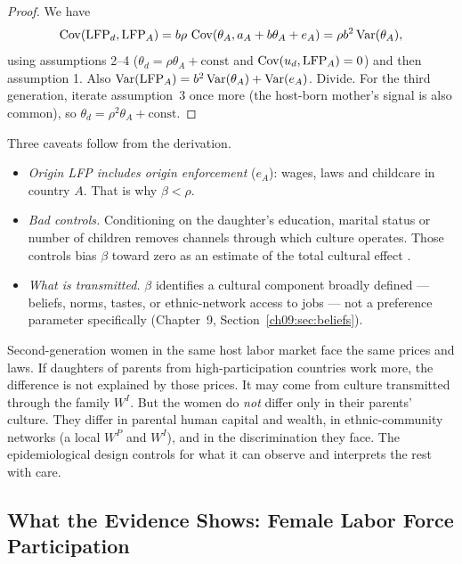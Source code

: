 \documentclass[../structural_economics_book.tex]{subfiles}
\begin{document}
\begin{proof}
We have
\[
\operatorname{Cov}(\text{LFP}_d, \text{LFP}_A) = b\rho\,\operatorname{Cov}(\theta_A, a_A + b\theta_A + e_A) = \rho b^2\operatorname{Var}(\theta_A),
\]
using assumptions 2--4 ($\theta_d = \rho\theta_A + \text{const}$ and $\operatorname{Cov}(u_d, \text{LFP}_A) = 0$) and then assumption 1. Also $\operatorname{Var}(\text{LFP}_A) = b^2\operatorname{Var}(\theta_A) + \operatorname{Var}(e_A)$. Divide. For the third generation, iterate assumption~3 once more (the host-born mother's signal is also common), so $\theta_d = \rho^2\theta_A + \text{const}$.
\end{proof}

Three caveats follow from the derivation.
\begin{itemize}
\item \textit{Origin LFP includes origin enforcement} ($e_A$): wages, laws and childcare in country $A$. That is why $\beta < \rho$.
\item \textit{Bad controls.} Conditioning on the daughter's education, marital status or number of children removes channels through which culture operates. Those controls bias $\beta$ toward zero as an estimate of the total cultural effect \citep[\S3.2.3]{angrist2009mostly}.
\item \textit{What is transmitted.} $\beta$ identifies a cultural component broadly defined --- beliefs, norms, tastes, or ethnic-network access to jobs --- not a preference parameter specifically (Chapter~9, Section~\ref{ch09:sec:beliefs}).
\end{itemize}

\begin{intuition}
Second-generation women in the same host labor market face the same prices and laws. If daughters of parents from high-participation countries work more, the difference is not explained by those prices. It may come from culture transmitted through the family $W^I$. But the women do \textit{not} differ only in their parents' culture. They differ in parental human capital and wealth, in ethnic-community networks (a local $W^P$ and $W^I$), and in the discrimination they face. The epidemiological design controls for what it can observe and interprets the rest with care.
\end{intuition}


\subsection{What the Evidence Shows: Female Labor Force Participation}
\end{document}
